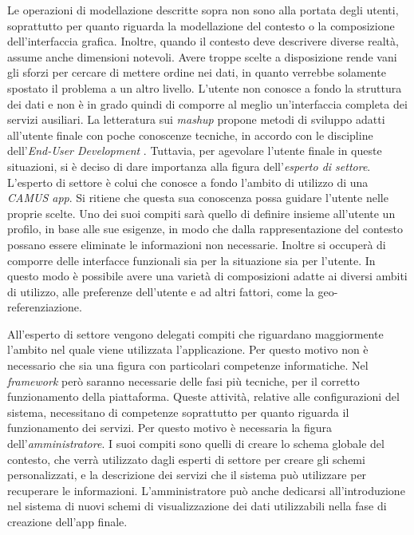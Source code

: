 Le operazioni di modellazione descritte sopra non sono alla portata degli utenti, soprattutto per quanto riguarda la modellazione del contesto o la composizione dell'interfaccia grafica. Inoltre, quando il contesto deve descrivere diverse realtà, assume anche dimensioni notevoli. Avere troppe scelte a disposizione rende vani gli sforzi per cercare di mettere ordine nei dati, in quanto verrebbe solamente spostato il problema a un altro livello. L'utente non conosce a fondo la struttura dei dati e non è in grado quindi di comporre al meglio un'interfaccia completa dei servizi ausiliari. La letteratura sui \textit{mashup} propone metodi di sviluppo adatti all'utente finale con poche conoscenze tecniche, in accordo con le discipline dell'\emph{End-User Development} \cite{Cappiello:2015:UAE:2788341.2735632}. Tuttavia, per agevolare l'utente finale in queste situazioni, si è deciso di dare importanza alla figura dell'\emph{esperto di settore}. L'esperto di settore è colui che conosce a fondo l'ambito di utilizzo di una \emph{CAMUS app}. Si ritiene che questa sua conoscenza possa guidare l'utente nelle proprie scelte. Uno dei suoi compiti sarà quello di definire insieme all'utente un profilo, in base alle sue esigenze, in modo che dalla rappresentazione del contesto possano essere eliminate le informazioni non necessarie. Inoltre si occuperà di comporre delle interfacce funzionali sia per la situazione sia per l'utente. In questo modo è possibile avere una varietà di composizioni adatte ai diversi ambiti di utilizzo, alle preferenze dell'utente e ad altri fattori, come la geo-referenziazione.

All'esperto di settore vengono delegati compiti che riguardano maggiormente l'ambito nel quale viene utilizzata l'applicazione. Per questo motivo non è necessario che sia una figura con particolari competenze informatiche. Nel \emph{framework} però saranno necessarie delle fasi più tecniche, per il corretto funzionamento della piattaforma. Queste attività, relative alle configurazioni del sistema, necessitano di competenze soprattutto per quanto riguarda il funzionamento dei servizi. Per questo motivo è necessaria la figura dell'\emph{amministratore}. I suoi compiti sono quelli di creare lo schema globale del contesto, che verrà utilizzato dagli esperti di settore per creare gli schemi personalizzati, e la descrizione dei servizi che il sistema può utilizzare per recuperare le informazioni. L'amministratore può anche dedicarsi all'introduzione nel sistema di nuovi schemi di visualizzazione dei dati utilizzabili nella fase di creazione dell'app finale.

